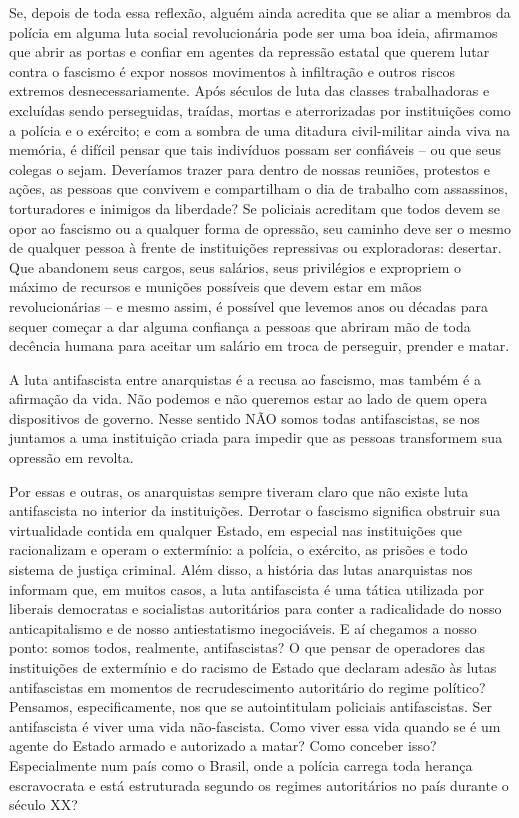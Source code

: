 Se, depois de toda essa reflexão, alguém ainda acredita que se aliar a membros da polícia em alguma luta social revolucionária pode ser uma boa ideia, afirmamos que abrir as portas e confiar em agentes da repressão estatal que querem lutar contra o fascismo é expor nossos movimentos à infiltração e outros riscos extremos desnecessariamente. Após séculos de luta das classes trabalhadoras e excluídas sendo perseguidas, traídas, mortas e aterrorizadas por instituições como a polícia e o exército; e com a sombra de uma ditadura civil-militar ainda viva na memória, é difícil pensar que tais indivíduos possam ser confiáveis – ou que seus colegas o sejam. Deveríamos trazer para dentro de nossas reuniões, protestos e ações, as pessoas que convivem e compartilham o dia de trabalho com assassinos, torturadores e inimigos da liberdade? Se policiais acreditam que todos devem se opor ao fascismo ou a qualquer forma de opressão, seu caminho deve ser o mesmo de qualquer pessoa à frente de instituições repressivas ou exploradoras: desertar. Que abandonem seus cargos, seus salários, seus privilégios e expropriem o máximo de recursos e munições possíveis que devem estar em mãos revolucionárias – e mesmo assim, é possível que levemos anos ou décadas para sequer começar a dar alguma confiança a pessoas que abriram mão de toda decência humana para aceitar um salário em troca de perseguir, prender e matar.

A luta antifascista entre anarquistas é a recusa ao fascismo, mas também é a afirmação da vida. Não podemos e não queremos estar ao lado de quem opera dispositivos de governo. Nesse sentido NÃO somos todas antifascistas, se nos juntamos a uma instituição criada para impedir que as pessoas transformem sua opressão em revolta.

Por essas e outras, os anarquistas sempre tiveram claro que não existe luta antifascista no interior da instituições. Derrotar o fascismo significa obstruir sua virtualidade contida em qualquer Estado, em especial nas instituições que racionalizam e operam o extermínio: a polícia, o exército, as prisões e todo sistema de justiça criminal. Além disso, a história das lutas anarquistas nos informam que, em muitos casos, a luta antifascista é uma tática utilizada por liberais democratas e socialistas autoritários para conter a radicalidade do nosso anticapitalismo e de nosso antiestatismo inegociáveis. E aí chegamos a nosso ponto: somos todos, realmente, antifascistas? O que pensar de operadores das instituições de extermínio e do racismo de Estado que declaram adesão às lutas antifascistas em momentos de recrudescimento autoritário do regime político? Pensamos, especificamente, nos que se autointitulam policiais antifascistas. Ser antifascista é viver uma vida não-fascista. Como viver essa vida quando se é um agente do Estado armado e autorizado a matar? Como conceber isso? Especialmente num país como o Brasil, onde a polícia carrega toda herança escravocrata e está estruturada segundo os regimes autoritários no país durante o século XX?

